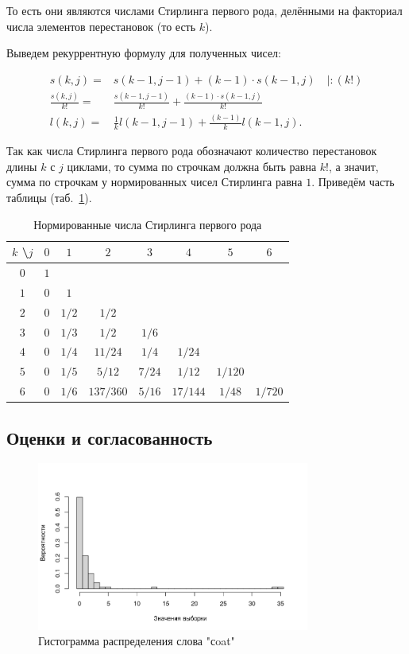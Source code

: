 \documentclass[12pt, specialist, subf, substylefile = spbu_report.rtx]{disser}
\begin{document}
	То есть они являются числами Стирлинга первого рода, делёнными на факториал числа элементов перестановок (то есть $ k $).
	
	Выведем рекуррентную формулу для полученных чисел:
	
	\[
		\begin{aligned}
			s(k, j) =& s(k - 1, j - 1) + (k - 1) \cdot s(k - 1, j) \quad | : (k!)\\
			\frac {s(k, j)} {k!} =& \frac {s(k - 1, j - 1)} {k !} + \frac {(k - 1) \cdot s(k - 1, j)} {k !}\\
			l(k, j) =& \frac {1} {k} l(k - 1, j - 1) + \frac {(k -1)} {k} l(k - 1, j).
		\end{aligned}
	\]
	
	Так как числа Стирлинга первого рода обозначают количество перестановок длины $k$ с $j$ циклами, то сумма по строчкам должна быть равна $k!$, а значит, сумма по строчкам у нормированных чисел Стирлинга равна $1$. Приведём часть таблицы (таб.~\ref{tab:normstirling1}).
	\begin{table}[!ht]
		\centering
		\caption{Нормированные числа Стирлинга первого рода}
		\begin{tabular}{c|ccccccc}
			$k$ \textbackslash $j$ & $0$ & $1$ & $2$ & $3$ & $4$ & $5$ & $6$\\ \hline
			$0$ & $1$ &  &  &  &  &  & \\
			$1$ & $0$ & $1$ &  &  &  &  & \\
			$2$ & $0$ & $1 / 2$ & $1 / 2$ &  &  &  & \\
			$3$ & $0$ & $1 / 3$ & $1 / 2$ & $1 / 6$ &  &  & \\
			$4$ & $0$ & $1 / 4$ & $11 / 24$ & $1 / 4$ & $1 / 24$ &  & \\
			$5$ & $0$ & $1 / 5$ & $5 / 12$ & $7 / 24$ & $1 / 12$ & $1 / 120$ & \\
			$6$ & $0$ & $1 / 6$ & $137 / 360$ & $5 / 16$ & $17 / 144$ & $1 / 48$ & $1 / 720$\\
		\end{tabular}
		\label{tab:normstirling1}
	\end{table}
	
	\subsection{Оценки и согласованность}
	
	\begin{figure}[ht]
		\centering
		\includegraphics[width = 0.8\textwidth]{coathist}
		\caption{Гистограмма распределения слова "сoat"}
		\label{img:coathist}
	\end{figure}
\end{document}

